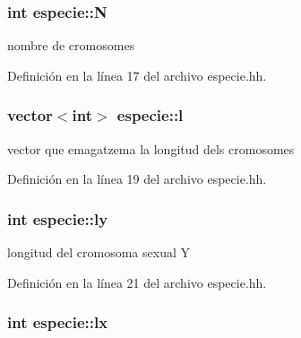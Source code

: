 \subsubsection[{\texorpdfstring{N}{N}}]{\setlength{\rightskip}{0pt plus 5cm}int especie\+::N\hspace{0.3cm}{\ttfamily [private]}}\hypertarget{classespecie_a3333db40d4af2c0073d50afea08e0296}{}\label{classespecie_a3333db40d4af2c0073d50afea08e0296}


nombre de cromosomes 



Definición en la línea 17 del archivo especie.\+hh.

\subsubsection[{\texorpdfstring{l}{l}}]{\setlength{\rightskip}{0pt plus 5cm}vector$<$int$>$ especie\+::l\hspace{0.3cm}{\ttfamily [private]}}\hypertarget{classespecie_a754d7eefb82d1ebe3f573cff16dd43ee}{}\label{classespecie_a754d7eefb82d1ebe3f573cff16dd43ee}


vector que emagatzema la longitud dels cromosomes 



Definición en la línea 19 del archivo especie.\+hh.

\subsubsection[{\texorpdfstring{ly}{ly}}]{\setlength{\rightskip}{0pt plus 5cm}int especie\+::ly\hspace{0.3cm}{\ttfamily [private]}}\hypertarget{classespecie_ad6993a4730779e367c432cce91780895}{}\label{classespecie_ad6993a4730779e367c432cce91780895}


longitud del cromosoma sexual Y 



Definición en la línea 21 del archivo especie.\+hh.

\subsubsection[{\texorpdfstring{lx}{lx}}]{\setlength{\rightskip}{0pt plus 5cm}int especie\+::lx\hspace{0.3cm}{\ttfamily [private]}}\hypertarget{classespecie_af620813fbc24dd91e5a25d38b5847bf8}{}\label{classespecie_af620813fbc24dd91e5a25d38b5847bf8}


